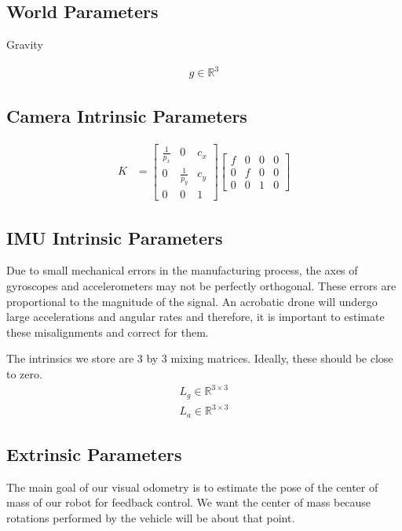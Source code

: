 \documentclass[11pt]{article}
\newcommand{\R}{\mathbb{R}}
\begin{document}
\subsection{World Parameters}
Gravity

\begin{align}
	g \in \R^3
\end{align}

\subsection{Camera Intrinsic Parameters}

\begin{align}
	K &= \begin{bmatrix}
	\frac{1}{p_x} & 0 & c_x\\
	0 & \frac{1}{p_y} & c_y\\
	0 & 0 & 1
	\end{bmatrix}\begin{bmatrix}
	f & 0 & 0 & 0\\
	0 & f & 0 & 0\\
	0 & 0 & 1 & 0
	\end{bmatrix}
\end{align}
\subsection{IMU Intrinsic Parameters}
Due to small mechanical errors in the manufacturing process, the axes of gyroscopes and accelerometers may not be perfectly orthogonal. These errors are proportional to the magnitude of the signal. An acrobatic drone will undergo large accelerations and angular rates and therefore, it is important to estimate these misalignments and correct for them.

The intrinsics we store are 3 by 3 mixing matrices. Ideally, these should be close to zero.
\begin{align}
	L_g \in \R^{3\times 3}\\
	L_a \in \R^{3\times 3}
\end{align}

\subsection{Extrinsic Parameters}
The main goal of our visual odometry is to estimate the pose of the center of mass of our robot for feedback control. We want the center of mass because rotations performed by the vehicle will be about that point.
\end{document}
